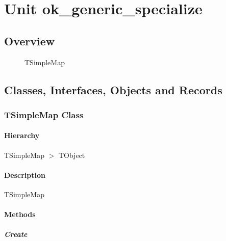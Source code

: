 \documentclass{report}
\newif\ifpdf
\begin{document}
\label{toc}\tableofcontents
\newpage
\newlength{\tmplength}
\chapter{Unit ok{\_}generic{\_}specialize}
\label{ok_generic_specialize}
\section{Overview}
\begin{description}
\item[\texttt{\begin{ttfamily}TSimpleMap\end{ttfamily} Class}]TSimpleMap
\end{description}
\section{Classes, Interfaces, Objects and Records}
\ifpdf
\subsection*{\large{\textbf{TSimpleMap Class}}\normalsize\hspace{1ex}\hrulefill}
\else
\subsection*{TSimpleMap Class}
\fi
\label{ok_generic_specialize.TSimpleMap}
\subsubsection*{\large{\textbf{Hierarchy}}\normalsize\hspace{1ex}\hfill}
TSimpleMap {$>$} TObject
\subsubsection*{\large{\textbf{Description}}\normalsize\hspace{1ex}\hfill}
TSimpleMap\subsubsection*{\large{\textbf{Methods}}\normalsize\hspace{1ex}\hfill}
\paragraph*{Create}\hspace*{\fill}
\end{document}
